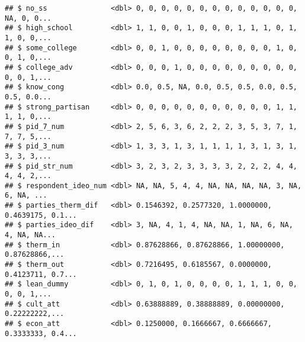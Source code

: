 \documentclass[
]{article}
\newenvironment{Shaded}{\begin{snugshade}}{\end{snugshade}}
\newcommand{\DataTypeTok}[1]{\textcolor[rgb]{0.13,0.29,0.53}{#1}}
\newcommand{\KeywordTok}[1]{\textcolor[rgb]{0.13,0.29,0.53}{\textbf{#1}}}
\newcommand{\NormalTok}[1]{#1}
\newcommand{\OperatorTok}[1]{\textcolor[rgb]{0.81,0.36,0.00}{\textbf{#1}}}
\newcommand{\OtherTok}[1]{\textcolor[rgb]{0.56,0.35,0.01}{#1}}
\newcommand{\StringTok}[1]{\textcolor[rgb]{0.31,0.60,0.02}{#1}}
\begin{document}
\begin{verbatim}
## $ no_ss               <dbl> 0, 0, 0, 0, 0, 0, 0, 0, 0, 0, 0, 0, 0, NA, 0, 0...
## $ high_school         <dbl> 1, 1, 0, 0, 1, 0, 0, 0, 1, 1, 1, 0, 1, 1, 0, 0,...
## $ some_college        <dbl> 0, 0, 1, 0, 0, 0, 0, 0, 0, 0, 0, 1, 0, 0, 1, 0,...
## $ college_adv         <dbl> 0, 0, 0, 1, 0, 0, 0, 0, 0, 0, 0, 0, 0, 0, 0, 1,...
## $ know_cong           <dbl> 0.0, 0.5, NA, 0.0, 0.5, 0.5, 0.0, 0.5, 0.5, 0.0...
## $ strong_partisan     <dbl> 0, 0, 0, 0, 0, 0, 0, 0, 0, 0, 0, 1, 1, 1, 1, 0,...
## $ pid_7_num           <dbl> 2, 5, 6, 3, 6, 2, 2, 2, 3, 5, 3, 7, 1, 7, 7, 5,...
## $ pid_3_num           <dbl> 1, 3, 3, 1, 3, 1, 1, 1, 1, 3, 1, 3, 1, 3, 3, 3,...
## $ pid_str_num         <dbl> 3, 2, 3, 2, 3, 3, 3, 3, 2, 2, 2, 4, 4, 4, 4, 2,...
## $ respondent_ideo_num <dbl> NA, NA, 5, 4, 4, NA, NA, NA, NA, 3, NA, 6, NA, ...
## $ parties_therm_dif   <dbl> 0.1546392, 0.2577320, 1.0000000, 0.4639175, 0.1...
## $ parties_ideo_dif    <dbl> 3, NA, 4, 1, 4, NA, NA, 1, NA, 6, NA, 4, NA, NA...
## $ therm_in            <dbl> 0.87628866, 0.87628866, 1.00000000, 0.87628866,...
## $ therm_out           <dbl> 0.7216495, 0.6185567, 0.0000000, 0.4123711, 0.7...
## $ lean_dummy          <dbl> 0, 1, 0, 1, 0, 0, 0, 0, 1, 1, 1, 0, 0, 0, 0, 1,...
## $ cult_att            <dbl> 0.63888889, 0.38888889, 0.00000000, 0.22222222,...
## $ econ_att            <dbl> 0.1250000, 0.1666667, 0.6666667, 0.3333333, 0.4...
\end{verbatim}

\begin{Shaded}
\end{Shaded}
\end{document}
